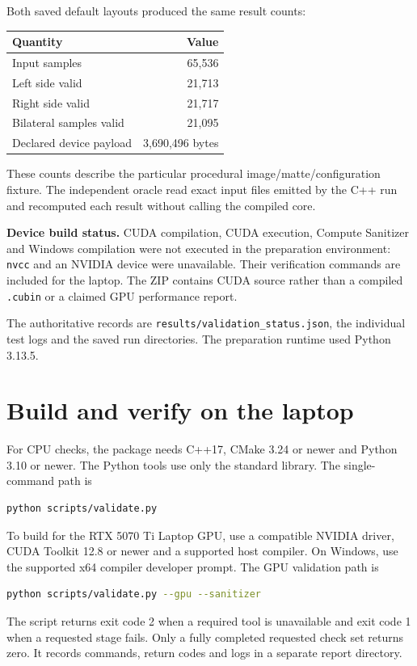 \documentclass[11pt,a4paper]{article}
\newcommand{\code}[1]{\texttt{#1}}
\begin{document}
Both saved default layouts produced the same result counts:
\begin{center}
\begin{tabular}{@{}lr@{}}\toprule
\textbf{Quantity} & \textbf{Value}\\\midrule
Input samples & 65,536\\
Left side valid & 21,713\\
Right side valid & 21,717\\
Bilateral samples valid & 21,095\\
Declared device payload & 3,690,496 bytes\\\bottomrule
\end{tabular}
\end{center}
These counts describe the particular procedural image/matte/configuration fixture. The independent oracle read exact input files emitted by the C++ run and recomputed each result without calling the compiled core.

\textbf{Device build status.} CUDA compilation, CUDA execution, Compute Sanitizer and Windows compilation were not executed in the preparation environment: \code{nvcc} and an NVIDIA device were unavailable. Their verification commands are included for the laptop. The ZIP contains CUDA source rather than a compiled \code{.cubin} or a claimed GPU performance report.

The authoritative records are \code{results/validation\_status.json}, the individual test logs and the saved run directories. The preparation runtime used Python 3.13.5.
\clearpage

\section{Build and verify on the laptop}
For CPU checks, the package needs C++17, CMake 3.24 or newer and Python 3.10 or newer. The Python tools use only the standard library. The single-command path is
\begin{lstlisting}[language=bash]
python scripts/validate.py
\end{lstlisting}
To build for the RTX 5070 Ti Laptop GPU, use a compatible NVIDIA driver, CUDA Toolkit 12.8 or newer and a supported host compiler. On Windows, use the supported x64 compiler developer prompt. The GPU validation path is
\begin{lstlisting}[language=bash]
python scripts/validate.py --gpu --sanitizer
\end{lstlisting}
The script returns exit code 2 when a required tool is unavailable and exit code 1 when a requested stage fails. Only a fully completed requested check set returns zero. It records commands, return codes and logs in a separate report directory.
\end{document}
